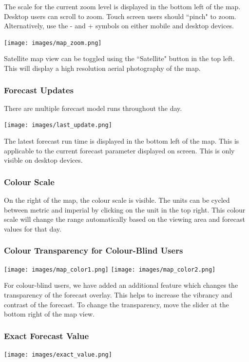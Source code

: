 \documentclass[11pt,a4paper]{article}
\begin{document}
The scale for the current zoom level is displayed in the bottom left of the map. Desktop users can scroll to zoom. Touch screen users should ``pinch" to zoom. Alternatively, use the - and + symbols on either mobile and desktop devices.
\begin{center}
\texttt{[image: images/map\_zoom.png]}
\end{center}
Satellite map view can be toggled using the ``Satellite" button in the top left. This will display a high resolution aerial photography of the map.

\subsubsection{Forecast Updates}
There are multiple forecast model runs throughout the day.
\begin{center}
\texttt{[image: images/last\_update.png]}
\end{center}
The latest forecast run time is displayed in the bottom left of the map. This is applicable to the current forecast parameter displayed on screen. This is only visible on desktop devices.

\subsubsection{Colour Scale}
On the right of the map, the colour scale is visible. The units can be cycled between metric and imperial by clicking on the unit in the top right. This colour scale will change the range automatically based on the viewing area and forecast values for that day.

\subsubsection{Colour Transparency for Colour-Blind Users}\label{subsec:colorblind}
\begin{center}
\texttt{[image: images/map\_color1.png]}
\texttt{[image: images/map\_color2.png]}
\end{center}


For colour-blind users, we have added an additional feature which changes the transparency of the forecast overlay. This helps to increase the vibrancy and contrast of the forecast. To change the transparency, move the slider at the bottom right of the map view.

\subsubsection{Exact Forecast Value}
\begin{center}
\texttt{[image: images/exact\_value.png]}
\end{center}
\end{document}
